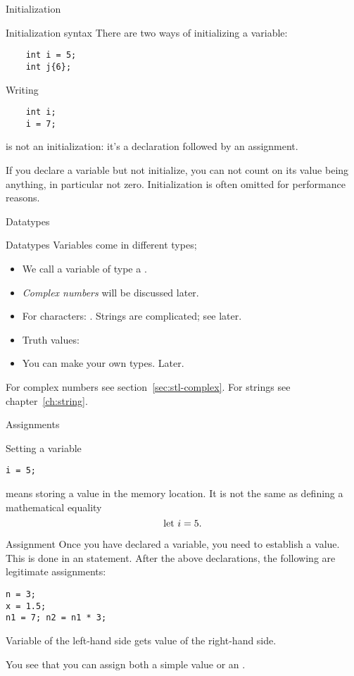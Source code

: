  {Initialization}

\begin{block}{Initialization syntax}
  There are two ways of initializing a variable:
  \begin{lstlisting}
    int i = 5;
    int j{6};
  \end{lstlisting}
  Writing 
  \begin{lstlisting}
    int i;
    i = 7;
  \end{lstlisting}
  is not an initialization: it's a declaration followed by an
  assignment.

  If you declare a variable but not initialize, you can not count on
  its value being anything, in particular not zero. Initialization is
  often omitted for performance reasons.
\end{block}

 {Datatypes}

\begin{block}{Datatypes}
  \label{sl:datatypes}
  Variables come in different types;
  \begin{itemize}
  \item We call a variable of type
     a .
  \item \emph{Complex numbers} will be
    discussed later.
  \item 
    For characters: . Strings are complicated; see later.
  \item Truth values: 
  \item 
    You can make your own types. Later.
  \end{itemize}
\end{block}

For complex numbers see section~\ref{sec:stl-complex}.
For strings see chapter~\ref{ch:string}.

 {Assignments}
\label{sec:ctypes}

Setting a variable
\begin{lstlisting}
i = 5;
\end{lstlisting}
means storing a value in the memory location. It is
not the same as defining a mathematical equality
\[ \hbox{let $i=5$}. \]

\begin{block}{Assignment}
  \label{sl:assign1}
  Once you have declared a variable, you need to establish a value. This is done in an
   statement. After the above declarations, the
  following are legitimate assignments:
\begin{lstlisting}
n = 3;
x = 1.5;
n1 = 7; n2 = n1 * 3;
\end{lstlisting}
Variable of the left-hand side gets value of the right-hand side.

You see that you can assign both a simple value or an
.
\end{block}

